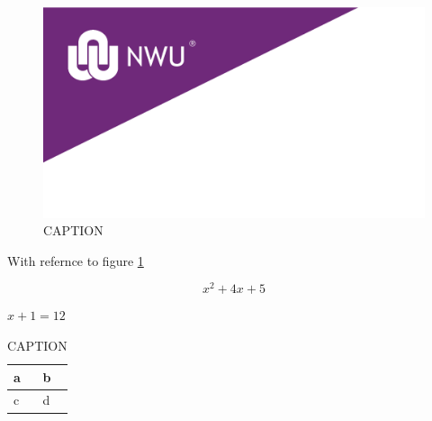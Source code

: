 \documentclass[a4paper, 11pt]{article} %
\begin{document}
\begin{figure}[h!]
\center
\includegraphics[scale=0.5]{NWU_Purple_Cover.png}
\caption{CAPTION}
\label{LABEL_NAME} %
\end{figure}

With refernce to figure \ref{LABEL_NAME} %

\begin{equation} 
x^2 + 4x + 5 
\label{EQUATION NAME}
\end{equation}

$ x + 1 = 12 $ %

\begin{table}[h!]
\center
\caption{CAPTION}
\vspace{0.2cm}
\label{LABEL NAME}
\begin{tabular}{|l|l|}
\hline
a & b \\ \hline
c & d   \\ \hline
\end{tabular}
\end{table}


%
\end{document}
